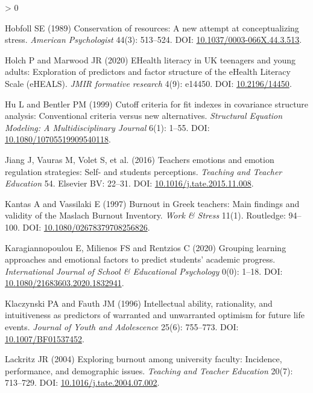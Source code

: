 \documentclass[
  english,
  man,floatsintext]{apa6}
\newlength{\cslhangindent}
\newenvironment{CSLReferences}[2] %
 {%
  \setlength{\parindent}{0pt}
  \ifodd #1 \everypar{\setlength{\hangindent}{\cslhangindent}}\ignorespaces\fi
  \ifnum #2 > 0
  \setlength{\parskip}{#2\baselineskip}
  \fi
 }%
 {}
\begin{document}
\begin{CSLReferences}{1}{0}
\leavevmode\hypertarget{ref-Hobfoll1989}{}%
Hobfoll SE (1989) Conservation of resources: {A} new attempt at conceptualizing stress. \emph{American Psychologist} 44(3): 513--524. DOI: \href{https://doi.org/10.1037/0003-066X.44.3.513}{10.1037/0003-066X.44.3.513}.

\leavevmode\hypertarget{ref-Holch2020}{}%
Holch P and Marwood JR (2020) {EHealth} literacy in {UK} teenagers and young adults: {Exploration} of predictors and factor structure of the {eHealth} {Literacy} {Scale} ({eHEALS}). \emph{JMIR formative research} 4(9): e14450. DOI: \href{https://doi.org/10.2196/14450}{10.2196/14450}.

\leavevmode\hypertarget{ref-Hu1999}{}%
Hu L and Bentler PM (1999) Cutoff criteria for fit indexes in covariance structure analysis: {Conventional} criteria versus new alternatives. \emph{Structural Equation Modeling: A Multidisciplinary Journal} 6(1): 1--55. DOI: \href{https://doi.org/10.1080/10705519909540118}{10.1080/10705519909540118}.

\leavevmode\hypertarget{ref-Jiang2016}{}%
Jiang J, Vauras M, Volet S, et al. (2016) Teachers{{}} emotions and emotion regulation strategies: Self- and students{{}} perceptions. \emph{Teaching and Teacher Education} 54. Elsevier {BV}: 22--31. DOI: \href{https://doi.org/10.1016/j.tate.2015.11.008}{10.1016/j.tate.2015.11.008}.

\leavevmode\hypertarget{ref-Kantas1997}{}%
Kantas A and Vassilaki E (1997) Burnout in {Greek} teachers: {Main} findings and validity of the {Maslach} {Burnout} {Inventory}. \emph{Work \& Stress} 11(1). Routledge: 94--100. DOI: \href{https://doi.org/10.1080/02678379708256826}{10.1080/02678379708256826}.

\leavevmode\hypertarget{ref-Karagiannopoulou2020}{}%
Karagiannopoulou E, Milienos FS and Rentzios C (2020) Grouping learning approaches and emotional factors to predict students' academic progress. \emph{International Journal of School \& Educational Psychology} 0(0): 1--18. DOI: \href{https://doi.org/10.1080/21683603.2020.1832941}{10.1080/21683603.2020.1832941}.

\leavevmode\hypertarget{ref-Klaczynski1996}{}%
Klaczynski PA and Fauth JM (1996) Intellectual ability, rationality, and intuitiveness as predictors of warranted and unwarranted optimism for future life events. \emph{Journal of Youth and Adolescence} 25(6): 755--773. DOI: \href{https://doi.org/10.1007/BF01537452}{10.1007/BF01537452}.

\leavevmode\hypertarget{ref-Lackritz2004}{}%
Lackritz JR (2004) Exploring burnout among university faculty: Incidence, performance, and demographic issues. \emph{Teaching and Teacher Education} 20(7): 713--729. DOI: \href{https://doi.org/10.1016/j.tate.2004.07.002}{10.1016/j.tate.2004.07.002}.


\end{CSLReferences}
\end{document}
